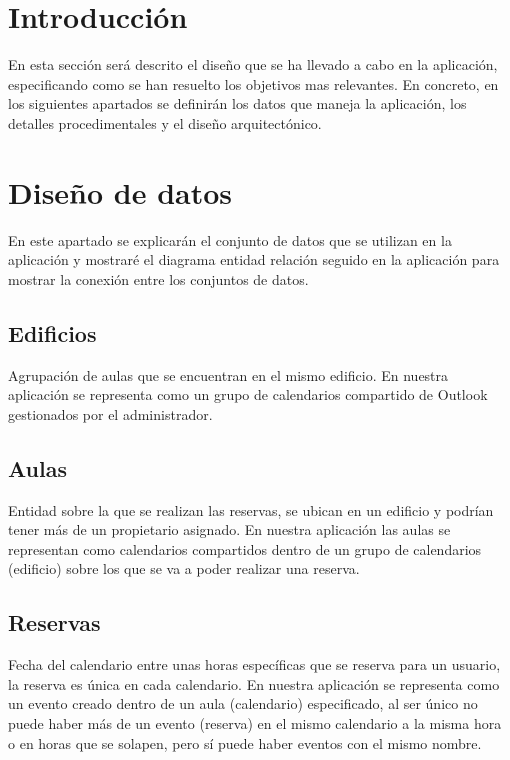 
\section{Introducción}
En esta sección será descrito el diseño que se ha llevado a cabo en la aplicación, especificando como se han resuelto los objetivos mas relevantes. En concreto, en los siguientes apartados se definirán los datos que maneja la aplicación, los detalles procedimentales y el diseño arquitectónico.
\section{Diseño de datos}
En este apartado se explicarán el conjunto de datos que se utilizan en la aplicación y mostraré el diagrama entidad relación seguido en la aplicación para mostrar la conexión entre los conjuntos de datos.


\subsection{Edificios}
Agrupación de aulas que se encuentran en el mismo edificio. En nuestra aplicación se representa como un grupo de calendarios compartido de Outlook gestionados por el administrador.

\subsection{Aulas}
Entidad sobre la que se realizan las reservas, se ubican en un edificio y podrían tener más de un propietario asignado. En nuestra aplicación las aulas se representan como calendarios compartidos dentro de un grupo de calendarios (edificio) sobre los que se va a poder realizar una reserva.

\subsection{Reservas}
Fecha del calendario entre unas horas específicas que se reserva para un usuario, la reserva es única en cada calendario. En nuestra aplicación se representa como un evento creado dentro de un aula (calendario) especificado, al ser único no puede haber más de un evento (reserva) en el mismo calendario a la misma hora o en horas que se solapen, pero sí puede haber eventos con el mismo nombre.

